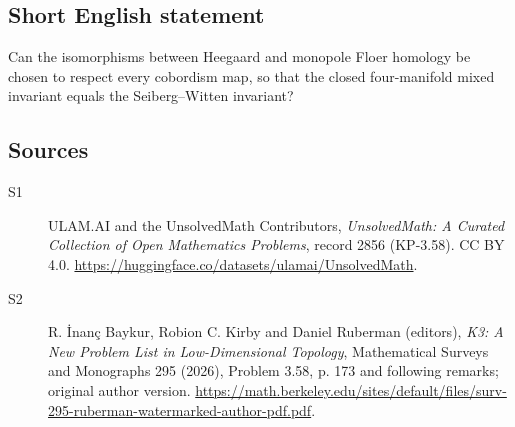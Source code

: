 \documentclass[11pt]{article}
\begin{document}
\subsection{Short English statement}
Can the isomorphisms between Heegaard and monopole Floer homology be chosen to respect every cobordism map, so that the closed four-manifold mixed invariant equals the Seiberg--Witten invariant?
\subsection{Sources}
\begin{description}
\item[\hypertarget{source:2856:1}{S1}] ULAM.AI and the UnsolvedMath Contributors, \emph{UnsolvedMath: A Curated Collection of Open Mathematics Problems}, record 2856 (KP-3.58). CC BY 4.0. \url{https://huggingface.co/datasets/ulamai/UnsolvedMath}.
\item[\hypertarget{source:2856:2}{S2}] R. İnanç Baykur, Robion C. Kirby and Daniel Ruberman (editors), \emph{K3: A New Problem List in Low-Dimensional Topology}, Mathematical Surveys and Monographs 295 (2026), Problem 3.58, p. 173 and following remarks; original author version. \url{https://math.berkeley.edu/sites/default/files/surv-295-ruberman-watermarked-author-pdf.pdf}.
\end{description}
\label{end:2856}
\end{document}
